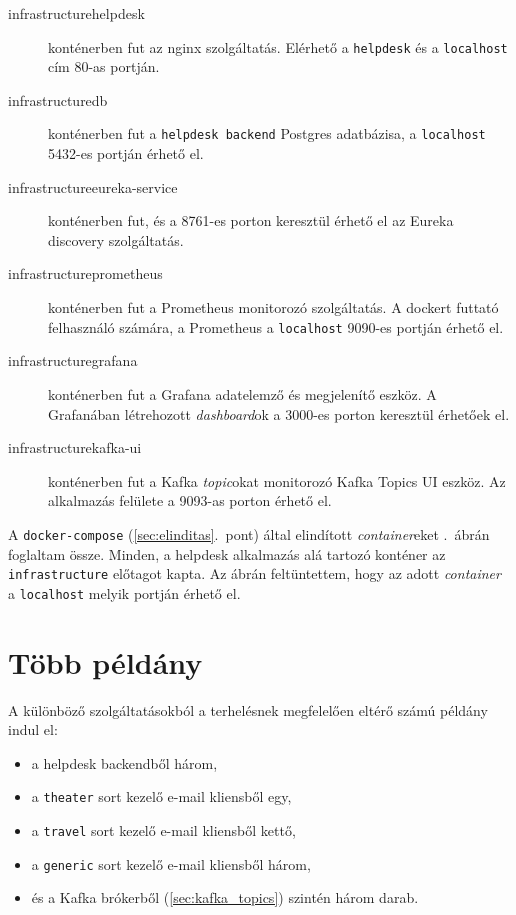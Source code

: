 \begin{description}
	\item[infrastructure\textunderscore helpdesk] konténerben fut az nginx szolgáltatás. Elérhető a \texttt{helpdesk} és a \texttt{localhost} cím 80-as portján.
	
	\item[infrastructure\textunderscore db] konténerben fut a \texttt{helpdesk backend} Postgres adatbázisa, a \texttt{localhost} 5432-es portján érhető el.
	
	\item[infrastructure\textunderscore eureka-service] konténerben fut, és a 8761-es porton keresztül érhető el az Eureka discovery szolgáltatás.
	
	\item[infrastructure\textunderscore prometheus] konténerben fut a Prometheus monitorozó szolgáltatás. A dockert futtató felhasználó számára, a Prometheus a \texttt{localhost} 9090-es portján érhető el.
	
	\item[infrastructure\textunderscore grafana] konténerben fut a Grafana adatelemző és megjelenítő eszköz. A Grafanában létrehozott \emph{dashboard}ok a 3000-es porton keresztül érhetőek el.

	\item[infrastructure\textunderscore kafka-ui] konténerben fut a Kafka \emph{topic}okat monitorozó Kafka Topics UI eszköz. Az alkalmazás felülete a 9093-as porton érhető el.	
\end{description}




A \texttt{docker-compose} (\ref{sec:elinditas}.~pont) által elindított \emph{container}eket .~ábrán foglaltam össze. Minden, a helpdesk alkalmazás alá tartozó konténer az \texttt{infrastructure} előtagot kapta. Az ábrán feltüntettem, hogy az adott \emph{container} a \texttt{localhost} melyik portján érhető el.


\section{Több példány}
A különböző szolgáltatásokból a terhelésnek megfelelően eltérő számú példány indul el:

\begin{itemize}
	\item a helpdesk backendből három,
	\item a \texttt{theater} sort kezelő e-mail kliensből egy,
	\item a \texttt{travel} sort kezelő e-mail kliensből kettő,
	\item a \texttt{generic} sort kezelő e-mail kliensből három,
	\item és a Kafka brókerből (\ref{sec:kafka_topics}) szintén három darab.
\end{itemize}

